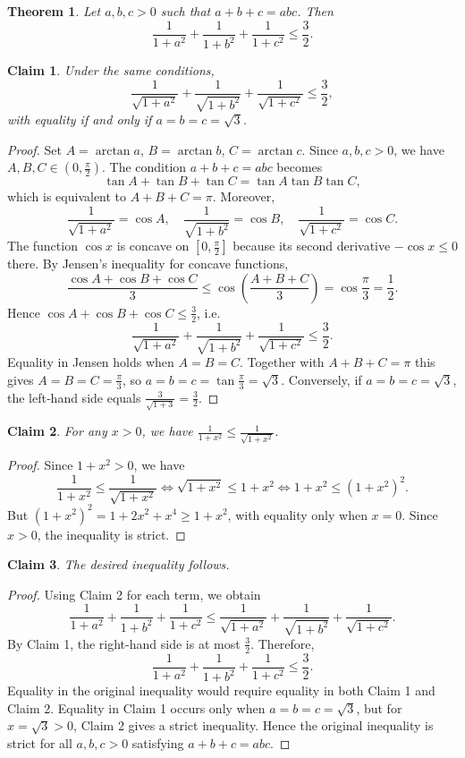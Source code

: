 \documentclass{article}
\newtheorem{theorem}{Theorem}
\newtheorem{claim}{Claim}
\begin{document}
\begin{theorem}
Let $a, b, c > 0$ such that $a + b + c = abc$. Then
\[
\frac{1}{1+a^2} + \frac{1}{1+b^2} + \frac{1}{1+c^2} \le \frac{3}{2}.
\]
\end{theorem}

\begin{claim}
Under the same conditions,
\[
\frac{1}{\sqrt{1+a^{2}}}+\frac{1}{\sqrt{1+b^{2}}}+\frac{1}{\sqrt{1+c^{2}}}\le\frac{3}{2},
\]
with equality if and only if $a=b=c=\sqrt{3}$.
\end{claim}
\begin{proof}
Set $A = \arctan a$, $B = \arctan b$, $C = \arctan c$. Since $a,b,c > 0$, we have $A,B,C \in (0, \frac{\pi}{2})$. The condition $a+b+c = abc$ becomes
\[
\tan A + \tan B + \tan C = \tan A \tan B \tan C,
\]
which is equivalent to $A+B+C = \pi$. Moreover,
\[
\frac{1}{\sqrt{1+a^{2}}} = \cos A,\quad
\frac{1}{\sqrt{1+b^{2}}} = \cos B,\quad
\frac{1}{\sqrt{1+c^{2}}} = \cos C.
\]
The function $\cos x$ is concave on $[0, \frac{\pi}{2}]$ because its second derivative $-\cos x \le 0$ there. By Jensen's inequality for concave functions,
\[
\frac{\cos A + \cos B + \cos C}{3} \le \cos\!\left(\frac{A+B+C}{3}\right) = \cos\frac{\pi}{3} = \frac12.
\]
Hence $\cos A + \cos B + \cos C \le \frac32$, i.e.
\[
\frac{1}{\sqrt{1+a^{2}}}+\frac{1}{\sqrt{1+b^{2}}}+\frac{1}{\sqrt{1+c^{2}}}\le\frac{3}{2}.
\]
Equality in Jensen holds when $A = B = C$. Together with $A+B+C = \pi$ this gives $A = B = C = \frac{\pi}{3}$, so $a = b = c = \tan\frac{\pi}{3} = \sqrt{3}$. Conversely, if $a = b = c = \sqrt{3}$, the left‑hand side equals $\frac{3}{\sqrt{1+3}} = \frac{3}{2}$.
\end{proof}

\begin{claim}
For any $x > 0$, we have $\frac{1}{1+x^2} \le \frac{1}{\sqrt{1+x^2}}$.
\end{claim}
\begin{proof}
Since $1+x^2 > 0$, we have
\[
\frac{1}{1+x^2} \le \frac{1}{\sqrt{1+x^2}} \Longleftrightarrow \sqrt{1+x^2} \le 1+x^2 \Longleftrightarrow 1+x^2 \le (1+x^2)^2.
\]
But $(1+x^2)^2 = 1 + 2x^2 + x^4 \ge 1 + x^2$, with equality only when $x=0$. Since $x>0$, the inequality is strict.
\end{proof}

\begin{claim}
The desired inequality follows.
\end{claim}
\begin{proof}
Using Claim 2 for each term, we obtain
\[
\frac{1}{1+a^2} + \frac{1}{1+b^2} + \frac{1}{1+c^2}
\le \frac{1}{\sqrt{1+a^{2}}} + \frac{1}{\sqrt{1+b^{2}}} + \frac{1}{\sqrt{1+c^{2}}}.
\]
By Claim 1, the right-hand side is at most $\frac{3}{2}$. Therefore,
\[
\frac{1}{1+a^2} + \frac{1}{1+b^2} + \frac{1}{1+c^2} \le \frac{3}{2}.
\]
Equality in the original inequality would require equality in both Claim 1 and Claim 2. Equality in Claim 1 occurs only when $a=b=c=\sqrt{3}$, but for $x=\sqrt{3}>0$, Claim 2 gives a strict inequality. Hence the original inequality is strict for all $a,b,c>0$ satisfying $a+b+c=abc$.
\end{proof}
\end{document}
